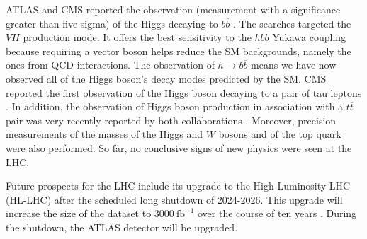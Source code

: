 ATLAS and CMS reported the observation (measurement with a significance greater than five sigma) of the Higgs decaying to $b\overline{b}$ \cite{ATLASh2bb_discovery, CMSh2bb_discovery}. The searches targeted the $VH$ production mode. It offers the best sensitivity to the $hb\bar{b}$ Yukawa coupling because requiring a vector boson helps reduce the SM backgrounds, namely the ones from QCD interactions. The observation of $h\rightarrow b\overline{b}$ means we have now observed all of the Higgs boson's decay modes predicted by the SM. CMS reported the first observation of the Higgs boson decaying to a pair of tau leptons \cite{CMSh2tautau}. In addition, the observation of Higgs boson production in association with a $t\overline{t}$ pair was very recently reported by both collaborations \cite{CMStth, ATLAStth}. Moreover, precision measurements of the masses of the Higgs \cite{ATLAShMass,hMass} and $W$ \cite{ATLASwMass} bosons and of the top quark \cite{ATLAStopMass, CMStopMass} were also performed. 
So far, no conclusive signs of new physics were seen at the LHC.

Future prospects for the LHC include its upgrade to the High Luminosity-LHC (HL-LHC) after
the scheduled long shutdown of 2024-2026. This upgrade will increase the size of the dataset to $3000~\text{fb}^{-1}$ over the course of ten years \cite{High-Luminosity}. 
During the shutdown, the ATLAS detector will be upgraded. 



